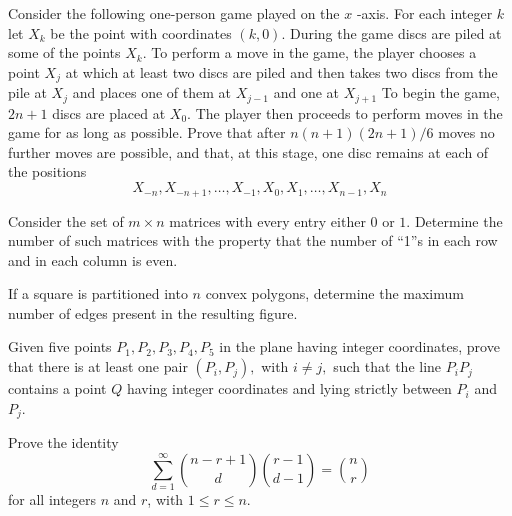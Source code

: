 \documentclass{pset}
\begin{document}
\begin{problems}
\begin{problem}[IrMO 1995 Q4]
    Consider the following one-person game played on the \(x\) -axis. For each integer \(k\)
    let \(X_{k}\) be the point with coordinates \((k, 0) .\) During the game discs are piled at some of the points \(X_{k} .\) To perform a move in the game, the player chooses a point
    \(X_{j}\) at which at least two discs are piled and then takes two discs from the pile at
    \(X_{j}\) and places one of them at \(X_{j-1}\) and one at \(X_{j+1}\)
    To begin the game, \(2 n+1\) discs are placed at \(X_{0} .\) The player then proceeds to perform moves in the game for as long as possible. Prove that after \(n(n+1)(2 n+1)/6\)
     moves no further moves are possible, and that, at this stage, one disc remains
    at each of the positions
    $$
    X_{-n}, X_{-n+1}, \ldots, X_{-1}, X_{0}, X_{1}, \ldots, X_{n-1}, X_{n}
    $$
\end{problem}

\begin{problem}[IrMO 1994 Q4]
    Consider the set of \(m \times n\) matrices with every entry either 0 or \(1 .\) Determine the number of such matrices with the property that the number of ``1''s in each row and in each column is even.
\end{problem}


\begin{problem}[IrMO 1994 Q10]
    If a square is partitioned into \(n\) convex polygons, determine the maximum number of edges present in the resulting figure.
\end{problem}

\begin{problem}[IrMO 1993 Q6]
    Given five points \(P_{1}, P_{2}, P_{3}, P_{4}, P_{5}\) in the plane having integer coordinates, prove that there is at least one pair \(\left(P_{i}, P_{j}\right),\) with \(i \neq j,\) such that the line \(P_{i} P_{j}\) contains a point \(Q\) having integer coordinates and lying strictly between \(P_{i}\) and \(P_{j}\).
\end{problem}

\begin{problem}[IrMO 1993 Q8]
Prove the identity
$$
\sum_{d = 1}^{\infty} \binom{n - r + 1}{d} \binom{r - 1}{d - 1} = \binom{n}{r}
$$
for all integers $n$ and $r$, with $1 \leq r \leq n$.
\end{problem}


\end{problems}
\end{document}
